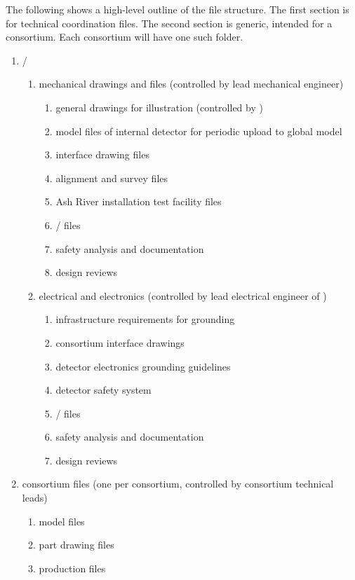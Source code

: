 The following shows a high-level outline of the file structure. The
first section is for technical coordination files. The second
section is generic, intended for a consortium. Each consortium will have one such
folder.
\begin{enumerate}
 \item {}/
 \begin{enumerate}
  \item mechanical drawings and files (controlled by  lead mechanical engineer)
  \begin{enumerate}
    \item {} general drawings for illustration (controlled by )
    \item \threed model files of internal detector for periodic upload to global model
    \item \twod interface drawing files
    \item alignment and survey files
    \item Ash River installation test facility files
    \item {}/ files
    \item safety analysis and documentation
    \item design reviews
  \end{enumerate}
  \item electrical and electronics (controlled by lead electrical engineer of )
  \begin{enumerate}
    \item infrastructure requirements for grounding
    \item consortium interface drawings
    \item detector electronics grounding guidelines
    \item detector safety system
    \item {}/ files
    \item safety analysis and documentation
      \item design reviews
  \end{enumerate}
 \end{enumerate}
 \item consortium files (one per consortium, controlled by consortium technical leads)
 \begin{enumerate}
   \item \threed model files
   \item \twod part drawing files
   \item production files

\end{enumerate}
\end{enumerate}
